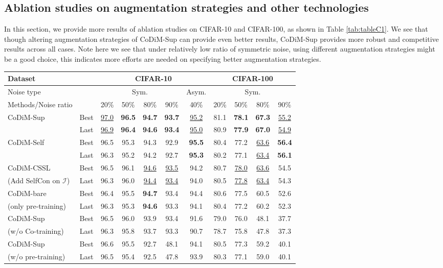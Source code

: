 \documentclass[letterpaper]{article} \usepackage{aaai22}  \usepackage{times}  \usepackage{helvet}  \usepackage{courier}  \usepackage[hyphens]{url}  \usepackage{graphicx} \usepackage{subfigure}
\begin{document}
\subsection{Ablation studies on augmentation strategies and other technologies}
In this section, we provide more results of ablation studies on CIFAR-10 and CIFAR-100, as shown in Table \ref{tab:tableC1}. We see that though altering augmentation strategies of CoDiM-Sup can provide even better results, CoDiM-Sup provides more robust and competitive results across all cases. Note here we see that under relatively low ratio of symmetric noise, using different augmentation strategies might be a good choice, this indicates more efforts are needed on specifying better augmentation strategies. 
\begin{table*}[ht]
\begin{center}
\begin{tabular}{lcccccccccc}
\hline
Dataset & & \multicolumn{5}{c}{CIFAR-10} & \multicolumn{4}{c}{CIFAR-100}\\
\hline
Noise type & & \multicolumn{4}{c}{Sym.} & Asym. & \multicolumn{4}{c}{Sym.} \\
\hline
Methods/Noise ratio & & 20\% & 50\% & 80\% & 90\% & 40\% & 20\% & 50\% & 80\% & 90\% \\
\hline
\multirow{2}{*}{CoDiM-Sup} & Best & \underline{97.0} & \textbf{96.5} & \textbf{94.7} & \textbf{93.7} & \underline{95.2} & 81.1 & \textbf{78.1} & \textbf{67.3} & \underline{55.2}\\
& Last & \underline{96.9} & \textbf{96.4} & \textbf{94.6} & \textbf{93.4} & \underline{95.0} & 80.9 & \textbf{77.9} & \textbf{67.0} & \underline{54.9} \\
\hline
\multirow{2}{*}{CoDiM-Self} & Best & 96.5 & 95.3 & 94.3 & 92.9 & \textbf{95.5} & 80.4 & 77.2 & \underline{63.6} & \textbf{56.4} \\
& Last & 96.3 & 95.2 & 94.2 & 92.7 & \textbf{95.3} & 80.2 & 77.1 & \underline{63.4} & \textbf{56.1} \\
\hline
CoDiM-CSSL & Best & 96.5 & 96.1 & \underline{94.6} & \underline{93.5} & 94.2 & 80.7 & \underline{78.0} & \underline{63.6} & 54.5 \\
(Add SelfCon on $\mathcal{I}$)& Last & 96.3 & 96.0 & \underline{94.4} & \underline{93.4} & 94.0 & 80.5 & \underline{77.8} & \underline{63.4} & 54.3 \\
\hline
CoDiM-bare & Best & 96.4 & 95.5 & \textbf{94.7} & 93.4 & 94.4 & 80.6 & 77.5 & 60.5 & 52.6 \\
(only pre-training) & Last & 96.3 & 95.3 & \textbf{94.6} & 93.3 & 94.1 & 80.4 & 77.2 & 60.2 & 52.3 \\
\hline
{CoDiM-Sup } & Best & 96.5 & 96.0 & 93.9 & 93.4 & 91.6 & 79.0 & 76.0 & 48.1 & 37.7 \\
(w/o Co-training) & Last & 96.3 & 95.8 & 93.7 & 93.3 & 90.7 & 78.7 & 75.8 & 47.8 & 37.3 \\
\hline
CoDiM-Sup & Best & 96.6 & 95.5 & 92.7 & 48.1 & 94.1 & 80.5 & 77.3 & 59.2 & 40.1 \\
(w/o pre-training)& Last & 96.5 & 95.4 & 92.5 & 47.8 & 93.9 & 80.3 & 77.1 & 59.0 & 40.1 \\
\hline


\end{tabular}
\end{center}
\end{table*}
\end{document}
